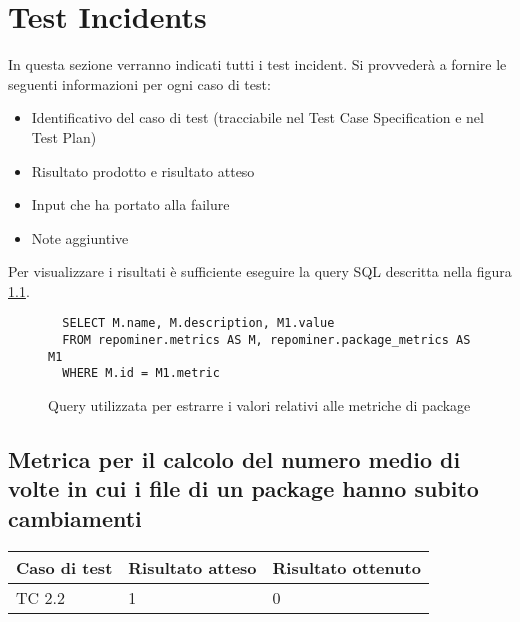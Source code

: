 \chapter{Test Incidents}

In questa sezione verranno indicati tutti i test incident. Si provvederà a fornire le seguenti informazioni per ogni caso di test:
\begin{itemize}
 \item Identificativo del caso di test (tracciabile nel Test Case Specification e nel Test Plan)
 \item Risultato prodotto e risultato atteso
 \item Input che ha portato alla failure
 \item Note aggiuntive
\end{itemize}

Per visualizzare i risultati è sufficiente eseguire la query SQL descritta nella figura \ref{figmetpack}.
\begin{figure}
 \begin{lstlisting}
  SELECT M.name, M.description, M1.value
  FROM repominer.metrics AS M, repominer.package_metrics AS M1 
  WHERE M.id = M1.metric
  \end{lstlisting}
  \caption{\footnotesize Query utilizzata per estrarre i valori relativi alle metriche di package}
  \label{figmetpack}
\end{figure}

\newpage
\section{Metrica per il calcolo del numero medio di volte in cui i file di un package hanno subito cambiamenti}
\begin{table}[ht]
	\centering
	\begin{tabular}{| l | l | l |}
		\hline
		\rowcolor{lightgray}\textbf{Caso di test}	&	\textbf{Risultato atteso}	&	\textbf{Risultato ottenuto}	\\
		\hline
		TC 2.2						&	1				&	0			   	\\
		\hline
	\end{tabular}
\end{table}

